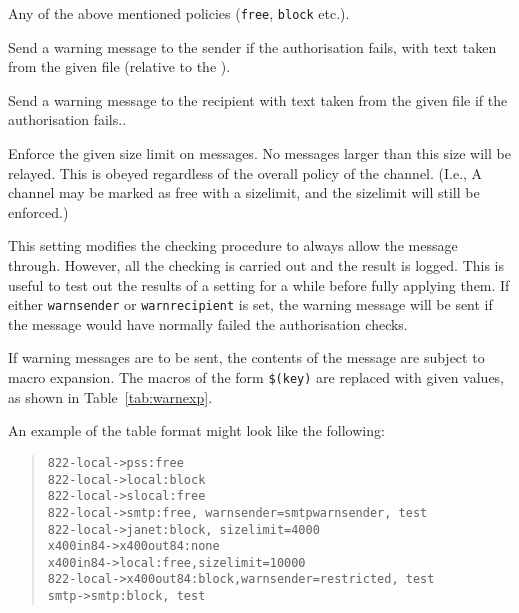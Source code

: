 \begin{describe}
\item[\verb|<policy>|:] Any of the above mentioned policies
(\verb|free|, \verb|block| etc.).

\item[\verb|warnsender=<file>|:]	
Send a warning message to the sender if the authorisation fails, with
text taken from the given file (relative to the ).

\item[\verb|warnrecipient=<file>|:]	Send a warning message to the
recipient with text taken from the given file if the authorisation fails..

\item[\verb|sizelimit=<digits>|:]	Enforce the given size
limit on messages. No messages larger than this size will be relayed.
This is obeyed regardless of the overall policy of the channel. (I.e.,
A channel may be marked as free with a sizelimit, and the sizelimit
will still be enforced.)

\item[\verb|test|:] This setting modifies the checking procedure to
always allow  the message through. However, all the checking is carried
out and the result is logged. This is useful to test out the results
of a setting for a while before fully applying them. If either
\verb|warnsender| or \verb|warnrecipient| is set, the warning message
will be sent if the message would have normally failed the
authorisation checks.
\end{describe}

If warning messages are to be sent, the contents of the message are
subject to macro expansion. The macros of the form \verb|$(key)| are
replaced with given values, as shown in Table~\ref{tab:warnexp}.



An example of the  table format might look like the
following: 
\begin{quote}\small\begin{verbatim}
822-local->pss:free
822-local->local:block
822-local->slocal:free
822-local->smtp:free, warnsender=smtpwarnsender, test
822-local->janet:block, sizelimit=4000
x400in84->x400out84:none
x400in84->local:free,sizelimit=10000
822-local->x400out84:block,warnsender=restricted, test
smtp->smtp:block, test
\end{verbatim}\end{quote}

